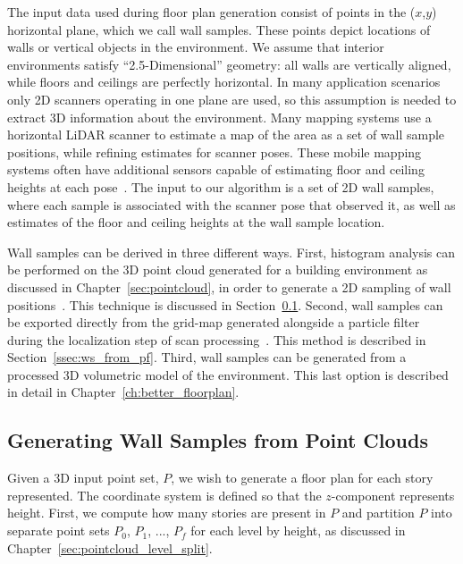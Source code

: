 \documentclass[12pt,onecolumn,oneside]{book}
\begin{document}
The input data used during floor plan generation consist of points in the ($x$,$y$) horizontal plane, which we call wall samples.  These points depict locations of walls or vertical objects in the environment.  We assume that interior environments satisfy ``2.5-Dimensional'' geometry:  all walls are vertically aligned, while floors and ceilings are perfectly horizontal.  In many application scenarios only 2D scanners operating in one plane are used, so this assumption is needed to extract 3D information about the environment.  Many mapping systems use a horizontal LiDAR scanner to estimate a map of the area as a set of wall sample positions, while refining estimates for scanner poses.  These mobile mapping systems often have additional sensors capable of estimating floor and ceiling heights at each pose~\cite{Backpack,Quadrotor}.  The input to our algorithm is a set of 2D wall samples, where each sample is associated with the scanner pose that observed it, as well as estimates of the floor and ceiling heights at the wall sample location.

Wall samples can be derived in three different ways.  First, histogram analysis can be performed on the 3D point cloud generated for a building environment as discussed in Chapter~\ref{sec:pointcloud}, in order to generate a 2D sampling of wall positions~\cite{Turner12}.  This technique is discussed in Section~\ref{ssec:ws_from_pc}.  Second, wall samples can be exported directly from the grid-map generated alongside a particle filter during the localization step of scan processing~\cite{NickJournal,Turner14}.  This method is described in Section~\ref{ssec:ws_from_pf}.  Third, wall samples can be generated from a processed 3D volumetric model of the environment.  This last option is described in detail in Chapter~\ref{ch:better_floorplan}.

\subsection{Generating Wall Samples from Point Clouds}
\label{ssec:ws_from_pc}

Given a 3D input point set, $P$, we wish to generate a floor plan for each story represented.  The coordinate system is defined so that the $z$-component represents height.  First, we compute how many stories are present in $P$ and partition $P$ into separate point sets $P_0$, $P_1$, ..., $P_f$ for each level by height, as discussed in Chapter~\ref{sec:pointcloud_level_split}.
\end{document}
